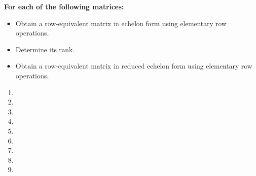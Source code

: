 \item {\bfseries\boldmath
    For each of the following matrices:
    \begin{itemize}
        \item Obtain a row-equivalent matrix in echelon form
              using elementary row operations.
        \item Determine its rank.
        \item Obtain a row-equivalent matrix in reduced echelon
              form using elementary row operations.
    \end{itemize}
}

\begin{enumerate}[label=\alph*)]

    \item 
        
    \item
        
    \item
        
    \item
        
    \item
        
    \item
        
    \item
        
    \item
        
    \item
        

\end{enumerate}

